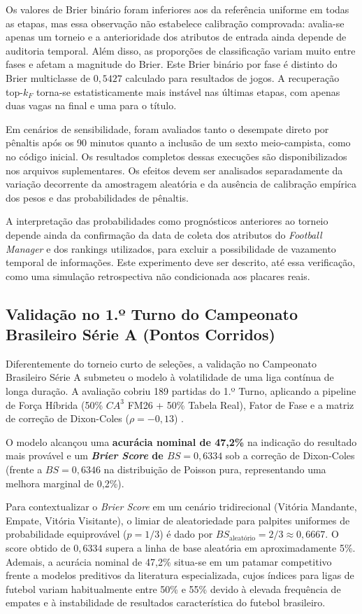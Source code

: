 \documentclass[12pt]{article}
\begin{document}
Os valores de Brier binário foram inferiores aos da referência uniforme em todas as etapas, mas essa observação não estabelece calibração comprovada: avalia-se apenas um torneio e a anterioridade dos atributos de entrada ainda depende de auditoria temporal. Além disso, as proporções de classificação variam muito entre fases e afetam a magnitude do Brier. Este Brier binário por fase é distinto do Brier multiclasse de $0,5427$ calculado para resultados de jogos. A recuperação top-$k_F$ torna-se estatisticamente mais instável nas últimas etapas, com apenas duas vagas na final e uma para o título.

Em cenários de sensibilidade, foram avaliados tanto o desempate direto por pênaltis após os 90 minutos quanto a inclusão de um sexto meio-campista, como no código inicial. Os resultados completos dessas execuções são disponibilizados nos arquivos suplementares. Os efeitos devem ser analisados separadamente da variação decorrente da amostragem aleatória e da ausência de calibração empírica dos pesos e das probabilidades de pênaltis.

A interpretação das probabilidades como prognósticos anteriores ao torneio depende ainda da confirmação da data de coleta dos atributos do \textit{Football Manager} e dos rankings utilizados, para excluir a possibilidade de vazamento temporal de informações. Este experimento deve ser descrito, até essa verificação, como uma simulação retrospectiva não condicionada aos placares reais.

\subsection{Validação no 1.º Turno do Campeonato Brasileiro Série A (Pontos Corridos)}

Diferentemente do torneio curto de seleções, a validação no Campeonato Brasileiro Série A submeteu o modelo à volatilidade de uma liga contínua de longa duração. A avaliação cobriu 189 partidas do 1.º Turno, aplicando a pipeline de Força Híbrida (50\% $CA^3$ FM26 + 50\% Tabela Real), Fator de Fase e a matriz de correção de Dixon-Coles ($\rho = -0{,}13$) \cite{dixon1997}.

O modelo alcançou uma \textbf{acurácia nominal de 47,2\%} na indicação do resultado mais provável e um \textbf{\textit{Brier Score} de $BS = 0{,}6334$} sob a correção de Dixon-Coles (frente a $BS = 0{,}6346$ na distribuição de Poisson pura, representando uma melhora marginal de 0,2\%).

Para contextualizar o \textit{Brier Score} em um cenário tridirecional (Vitória Mandante, Empate, Vitória Visitante), o limiar de aleatoriedade para palpites uniformes de probabilidade equiprovável ($p = 1/3$) é dado por $BS_{\text{aleatório}} = 2/3 \approx 0{,}6667$. O score obtido de $0{,}6334$ supera a linha de base aleatória em aproximadamente 5\%. Ademais, a acurácia nominal de 47,2\% situa-se em um patamar competitivo frente a modelos preditivos da literatura especializada, cujos índices para ligas de futebol variam habitualmente entre 50\% e 55\% devido à elevada frequência de empates e à instabilidade de resultados característica do futebol brasileiro.
\end{document}
